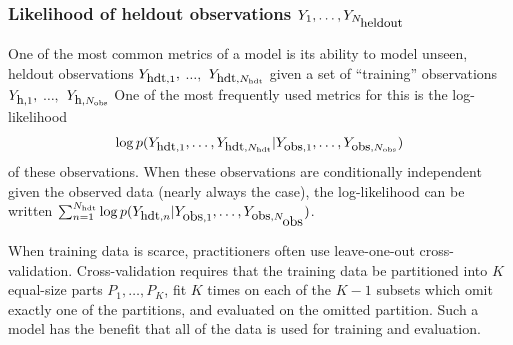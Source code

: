 


\subsubsection{Likelihood of heldout observations $Y_1, \ldots,
  Y_{N_{\mbox{\small heldout}}}$}
One of the most common metrics of a model is its ability to model
unseen, heldout observations $Y_{\mbox{\small hdt},1},$ $\ldots,$
$Y_{\mbox{\small hdt},N_{\mbox{\tiny hdt}}}$ given a set of ``training''
  observations $Y_{\mbox{\small h},1},$ $\ldots,$ $Y_{\mbox{\small
      h},N_{\mbox{\tiny obs}}}$ One of the most frequently used metrics
    for this is the log-likelihood
\begin{align*}
  \log
  p(Y_{\mbox{\small hdt},1}, \ldots, Y_{\mbox{\small hdt},N_{\mbox{\tiny hdt}}}
  | Y_{\mbox{\small obs},1}, \ldots, Y_{\mbox{\small obs}, N_{\mbox{\tiny obs}}})
\end{align*}
of these observations. When these observations are conditionally
independent given the observed data (nearly always the case), the
log-likelihood can be written $\sum_{n=1}^{N_{\mbox{\tiny hdt}}} \log
  p(Y_{\mbox{\small hdt},n} | Y_{\mbox{obs},1}, \ldots, Y_{\mbox{\small obs},N_{\mbox{obs}}})$.

When training data is scarce, practitioners often use leave-one-out
cross-validation.  Cross-validation requires that the training data be
partitioned into $K$ equal-size parts $P_1, \ldots, P_K$, fit $K$
times on each of the $K - 1$ subsets which omit exactly one of the
partitions, and evaluated on the omitted partition.  Such a model has
the benefit that all of the data is used for training and evaluation.

